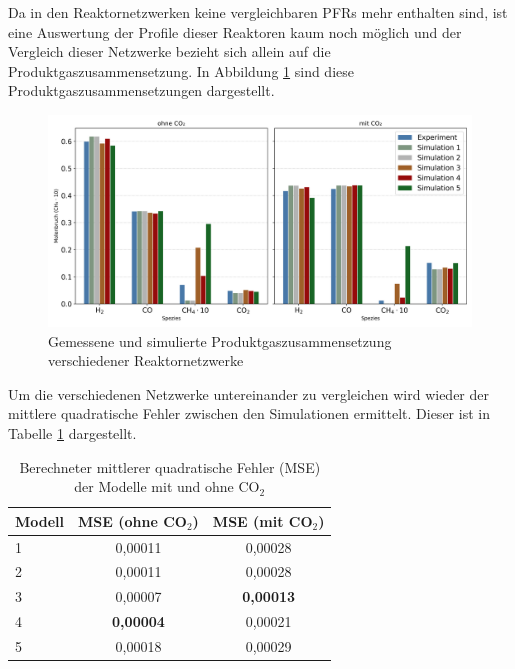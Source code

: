         Da in den Reaktornetzwerken keine vergleichbaren PFRs mehr enthalten sind, ist eine Auswertung der Profile dieser Reaktoren kaum noch möglich und der Vergleich dieser Netzwerke bezieht sich allein auf die Produktgaszusammensetzung. In Abbildung \ref{fig:auswertung_erweiterungen_spezies} sind diese Produktgaszusammensetzungen dargestellt. 
        \begin{figure}[H]
            \centering
            \includegraphics[width=1\linewidth]{img/Erweiterungen/Vergleich_Erweiterungen.png}
            \caption{Gemessene und simulierte Produktgaszusammensetzung verschiede\-ner Reaktornetzwerke}
            \label{fig:auswertung_erweiterungen_spezies}
        \end{figure}
        Um die verschiedenen Netzwerke untereinander zu vergleichen wird wieder der mit\-tlere quadratische Fehler zwischen den Simulationen ermittelt. Dieser ist in Tabelle \ref{tab:tvd_modelle} dargestellt.
        \begin{table}[H]
            \centering
            \caption{Berechneter mittlerer quadratische Fehler (MSE) der Modelle mit und ohne CO$_2$}
            \label{tab:tvd_modelle}
            \begin{tabular}{lcc}
                \toprule
                \textbf{Modell} & \textbf{MSE (ohne CO$_2$)} & \textbf{MSE (mit CO$_2$)} \\
                \midrule
                1 & 0,00011 & 0,00028 \\
                2 & 0,00011 & 0,00028 \\
                3 & 0,00007 & \textbf{0,00013} \\
                4 & \textbf{0,00004} & 0,00021 \\
                5 & 0,00018 & 0,00029 \\
                \bottomrule
            \end{tabular}
        \end{table}
